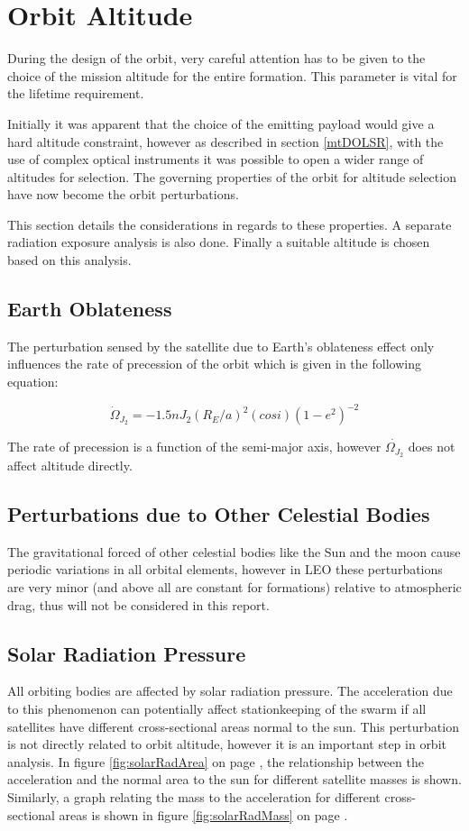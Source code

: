 \section{Orbit Altitude}
\label{mtrOrbAltitude}
During the design of the orbit, very careful attention has to be given to the choice of the mission altitude for the entire formation. This parameter is vital for the lifetime requirement.

Initially it was apparent that the choice of the emitting payload would give a hard altitude constraint, however as described in section \ref{mtDOLSR}, with the use of complex optical instruments it was possible to open a wider range of altitudes for selection. The governing properties of the orbit for altitude selection have now become the orbit perturbations.

This section details the considerations in regards to these properties. A separate radiation exposure analysis is also done. Finally a suitable altitude is chosen based on this analysis.
\subsection{Earth Oblateness}
\label{mtrOrbJ2}
The perturbation sensed by the satellite due to Earth's oblateness effect only influences the rate of precession of the orbit which is given in the following equation:

\begin{equation}
\dot{\Omega} _{J_2} = -1.5nJ_2 ( R_E / a )^2 ( cos i ) ( 1-e^2 )^{-2}
\label{j2eq}
\end{equation}

The rate of precession is a function of the semi-major axis, however $\dot{\Omega _{J_2}}$ does not affect altitude directly.

\subsection{Perturbations due to Other Celestial Bodies}
\label{mtrOrbSelestialBodies}
The gravitational forced of other celestial bodies like the Sun and the moon  cause periodic variations in all orbital elements, however in \ac{LEO} these perturbations are very minor (and above all are constant for formations) relative to atmospheric drag, thus will not be considered in this report.
\subsection{Solar Radiation Pressure}
\label{mtrOrbSolRadiation}
All orbiting bodies are affected by solar radiation pressure. The acceleration due to this phenomenon can potentially affect stationkeeping of the swarm if all satellites have different cross-sectional areas normal to the sun. This perturbation is not directly related to orbit altitude, however it is an important step in orbit analysis. In figure \ref{fig:solarRadArea} on page \pageref{fig:solarRadArea}, the relationship between the acceleration and the normal area to the sun for different satellite masses is shown. Similarly, a graph relating the mass to the acceleration for different cross-sectional areas is shown in figure \ref{fig:solarRadMass} on page \pageref{fig:solarRadMass}.

